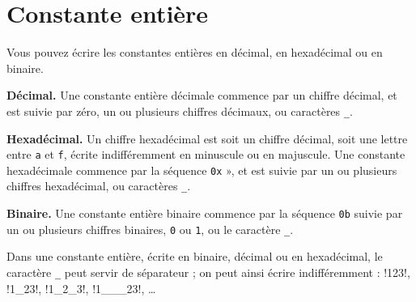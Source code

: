 %
%
%



\section{Constante entière}

Vous pouvez écrire les constantes entières en décimal, en hexadécimal ou en binaire. 

\textbf{Décimal.} Une constante entière décimale commence par un chiffre décimal, et est suivie par zéro, un ou plusieurs chiffres décimaux, ou caractères \texttt{\_}.

\textbf{Hexadécimal.} Un chiffre hexadécimal est soit un chiffre décimal, soit une lettre entre \texttt{a} et \texttt{f}, écrite indifféremment en minuscule ou en majuscule. Une constante hexadécimale commence par la séquence \texttt{0x} », et est suivie par un ou plusieurs chiffres hexadécimal, ou caractères \texttt{\_}.

\textbf{Binaire.} Une constante entière binaire commence par la séquence \texttt{0b} suivie par un ou plusieurs chiffres binaires, \texttt{0} ou \texttt{1}, ou le caractère \texttt{\_}.

Dans une constante entière, écrite en binaire, décimal ou en hexadécimal, le caractère \texttt{\_} peut servir de séparateur ; on peut ainsi écrire indifféremment : \plm!123!, \plm!1_23!, \plm!1_2_3!, \plm!1___23!, \dots

